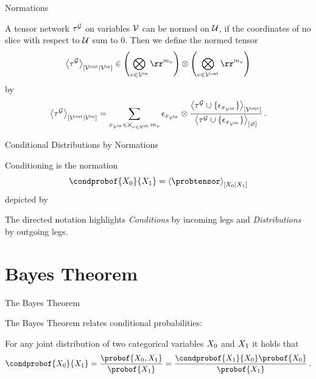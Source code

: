 \documentclass{beamer}
\begin{document}
    \begin{frame}{Normations}

        \begin{definition}
	A tensor network $\tau^{\mathcal{G}}$ on variables $\mathcal{V}$ can be normed on $\mathcal{U}$, if the coordinates of no slice with respect to $\mathcal{U}$ sum to $0$.
    Then we define the normed tensor
    \[ \normalizationofwrt{\extnet}{\outnodes}{\innodes}
    \in \left( \bigotimes_{\node\in\innodes} \rr^{\catdimof{\node}} \right) \otimes \left( \bigotimes_{\node\in\outnodes} \rr^{\catdimof{\node}} \right) \]
    by
    \begin{align*}
        \left\langle \tau^{\mathcal{G}}\right\rangle_{\left[ \mathcal{V}^{\mathrm{out}} | \mathcal{V}^{\mathrm{in}} \right]}
        = \sum_{x_{\mathcal{V}^{\mathrm{in}}}\in\bigtimes_{v\in\mathcal{V}^{\mathrm{in}}}m_{v}}
        \epsilon_{x_{\mathcal{V}^{\mathrm{in}}}} \otimes \frac{
            \left\langle \tau^{\mathcal{G}}\cup\{\epsilon_{x_{\mathcal{V}^{\mathrm{in}}}}\}\right\rangle_{\left[ \mathcal{V}^{\mathrm{out}} \right]}
        }{
            \left\langle \tau^{\mathcal{G}}\cup\{\epsilon_{x_{\mathcal{V}^{\mathrm{in}}}}\}\right\rangle_{\left[ \varnothing \right]}
        } \, .
    \end{align*}
        \end{definition}

    \end{frame}



    \begin{frame}{Conditional Distributions by Normations}

        Conditioning is the normation
        \[ \condprobof{\exrandom}{\secexrandom} = \normalizationofwrt{\probtensor}{\exrandom}{\secexrandom} \]
        depicted by
        \begin{center}
            
        \end{center}

        The directed notation highlights \emph{Conditions} by incoming legs and \emph{Distributions} by outgoing legs.


    \end{frame}

    
    \section{Bayes Theorem}

    \begin{frame}{The Bayes Theorem}

        The Bayes Theorem relates conditional probabilities:

        \begin{theorem}
            For any joint distribution of two categorical variables $X_{0}$ and $X_{1}$ it holds that
            \[ \condprobof{\exrandom}{\secexrandom} = \frac{\probof{\exrandom,\secexrandom}}{\probof{\secexrandom}}
            = \frac{\condprobof{\secexrandom}{\exrandom}\probof{\exrandom}}{\probof{\secexrandom}}  \, . \]
        \end{theorem}

    \end{frame}
\end{document}
